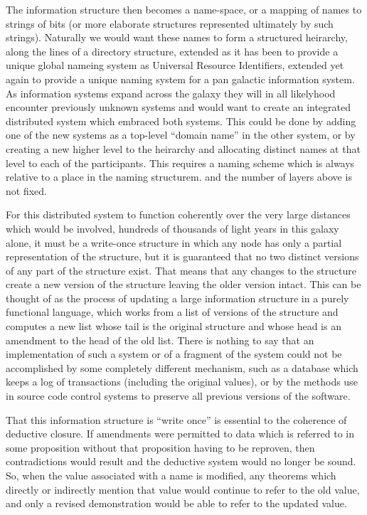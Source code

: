 \documentclass[10pt,titlepage]{article}
\begin{document}
The information structure then becomes a name-space, or a mapping of names to strings of bits (or more elaborate structures represented ultimately by such strings).
Naturally we would want these names to form a structured heirarchy, along the lines of a directory structure, extended as it has been to provide a unique global nameing system as Universal Resource Identifiers, extended yet again to provide a unique naming system for a pan galactic information system.
As information systems expand across the galaxy they will in all likelyhood encounter previously unknown systems and would want to create an integrated distributed system which embraced both systems.
This could be done by adding one of the new systems as a top-level ``domain name'' in the other system, or by creating a new higher level to the heirarchy and allocating distinct names at that level to each of the participants.
This requires a naming scheme which is always relative to a place in the naming structurem. and the number of layers above is not fixed.

For this distributed system to function coherently over the very large distances which would be involved, hundreds of thousands of light years in this galaxy alone, it must be a write-once structure in which any node has only a partial representation of the structure, but it is guaranteed that no two distinct versions of any part of the structure exist.
That means that any changes to the structure create a new version of the structure leaving the older version intact.
This can be thought of as the process of updating a large information structure in a purely functional language, which works from a list of versions of the structure and computes a new list whose tail is the original structure and whose head is an amendment to the head of the old list.
There is nothing to say that an implementation of such a system or of a fragment of the system could not be accomplished by some completely different mechanism, such as a database which keeps a log of transactions (including the original values), or by the methods use in source code control systems to preserve all previous versions of the software.

That this information structure is ``write once'' is essential to the coherence of deductive closure.
If amendments were permitted to data which is referred to in some proposition without that proposition having to be reproven, then contradictions would result and the deductive system would no longer be sound.
So, when the value associated with a name is modified, any theorems which directly or indirectly mention that value would continue to refer to the old value, and only a revised demonstration would be able to refer to the updated value.
\end{document}

